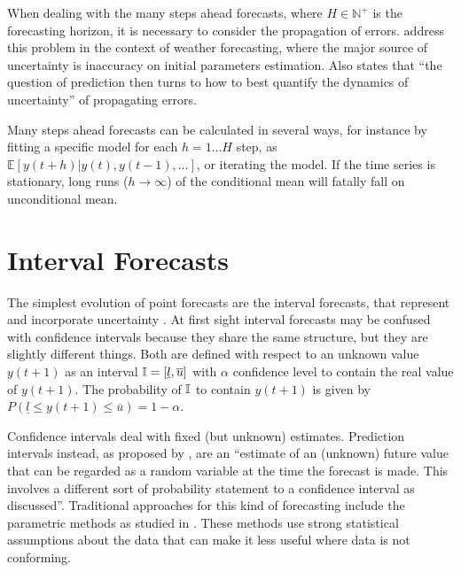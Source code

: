 When dealing with the many steps ahead forecasts, where $H \in \mathbb{N}^+$ is the forecasting horizon, it is necessary to consider the propagation of errors. \cite{Leutbecher2008} address this problem in the context of weather forecasting, where the major source of uncertainty is inaccuracy on initial parameters estimation. Also \cite{Smith2001} states that ``the question of prediction then turns to how to best quantify the dynamics of uncertainty'' of propagating errors.

Many steps ahead forecasts can be calculated in several ways, for instance by fitting a specific model for each $h = 1\ldots H$ step, as $\mathbb{E}[y(t+h)|y(t),y(t-1),\ldots]$, or iterating the model. If the time series is stationary, long runs ($h \rightarrow \infty$) of the conditional mean will fatally fall on unconditional mean.



%
\section{Interval Forecasts}
\label{sec:prob_interval}

The simplest evolution of point forecasts are the interval forecasts, that represent and incorporate uncertainty \cite{Hansen2006}. At first sight interval forecasts may be confused with confidence intervals because they share the same structure, but they are slightly different things. Both are defined with respect to an unknown value $y(t+1)$ as an interval $\mathbb{I} = [\underline{l},\overline{u}{]}$  with $\alpha$ confidence level to contain the real value of $y(t+1)$. The probability of $\mathbb{I}$ to contain $y(t+1)$ is given by $P(\underline{l} \leq y(t+1) \leq \overline{u}) = 1 - \alpha$.

Confidence intervals deal with fixed (but unknown) estimates. Prediction intervals instead, as proposed by \cite{Chatfield1993}, are an ``estimate of an (unknown) future value that can be regarded as a random variable at the time the forecast is made. This involves a different sort of probability statement to a confidence interval as discussed''. Traditional approaches for this kind of forecasting include the parametric methods as studied in  \cite{Chatfield1993}. These methods use strong statistical assumptions about the data that can make it less useful where data is not conforming.

